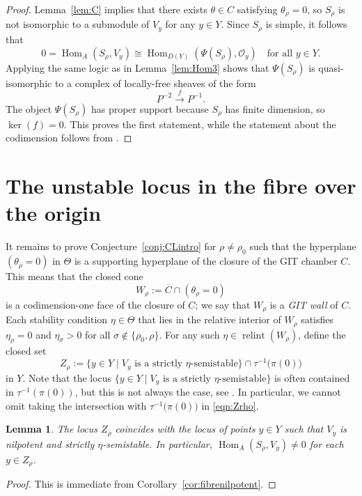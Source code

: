 \documentclass[11pt,reqno]{amsart}
\numberwithin{equation}{section}
\newtheorem{lemma}[theorem]{Lemma}
\theoremstyle{definition}
\newcommand{\Hom}{\operatorname{Hom}}
\newcommand{\0}{\operatorname{0}}
\newcommand{\relint}{\operatorname{relint}}
\begin{document}
\begin{proof}
 Lemma~\ref{lem:C} implies that there exists $\theta\in C$ satisfying $\theta_\rho=0$, so $S_\rho$ is not isomorphic to a submodule of $V_y$ for any $y\in Y$. Since $S_\rho$ is simple, it follows that 
 \[
 0=\Hom_A(S_\rho,V_y) \cong \Hom_{D(Y)}(\Psi(S_\rho),\mathcal{O}_y) \quad \text{for all }y\in Y.
 \]
 Applying the same logic as in Lemma~\ref{lem:Hom3} shows that  $\Psi(S_\rho)$ is quasi-isomorphic to a complex of locally-free sheaves of the form
 \[
 P^{-2}\stackrel{f}{\longrightarrow} P^{-1}.
 \]
 The object $\Psi(S_\rho)$ has proper support because $S_\rho$ has finite dimension, so $\ker(f)=0$. This proves the first statement, while the statement about the codimension follows from \cite[Corollary~5.5]{BM02}. 
\end{proof}

 


 \section{The unstable locus in the fibre over the origin}
  It remains to prove Conjecture~\ref{conj:CLintro} for $\rho\neq \rho_0$ such that the hyperplane $(\theta_\rho=0)$ in $\Theta$ is a supporting hyperplane of the closure of the GIT chamber $C$. This means that the closed cone
 \[
 W_\rho:= \overline{C}\cap (\theta_\rho=0)
 \]
 is a codimension-one face of the closure of $C$; we say that  $W_\rho$ is a \emph{GIT wall} of $C$. Each stability condition $\eta\in \Theta$ that lies in the relative interior of $W_\rho$ satisfies $\eta_\rho=0$ and $\eta_\sigma>0$ for all $\sigma\not\in\{\rho_0,\rho\}$.   For any such $\eta\in \relint(W_\rho)$, define the closed set
  \begin{equation}
     \label{eqn:Zrho} 
 Z_\rho := \{ y\in Y \mid V_y\text{ is a strictly }\eta\text{-semistable}\}\cap \tau^{-1}\big(\pi(0)\big)
  \end{equation}
  in $Y$. Note that the locus $\{ y\in Y \mid V_y\text{ is a strictly }\eta\text{-semistable}\}$ is often contained in $\tau^{-1}(\pi(0))$, but this is not always the case, see \cite[Example~1]{BCQ21}. In particular, we cannot omit taking the intersection with $\tau^{-1}\big(\pi(0)\big)$ in \eqref{eqn:Zrho}.
   
   
 \begin{lemma}
 \label{lem:Homnonzero}
 The locus $Z_\rho$ coincides with the locus of points $y\in Y$ such that $V_y$ is nilpotent and strictly $\eta$-semistable. In particular,  $\Hom_A(S_\rho,V_y)\neq 0$ for each $y\in Z_\rho$.
  \end{lemma}
 \begin{proof}
 This is immediate from Corollary~\ref{cor:fibrenilpotent}.
 \end{proof}
\end{document}
